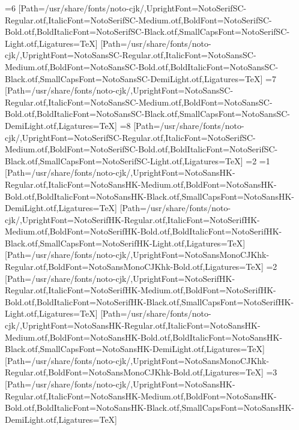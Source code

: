 \else\ifnum\value{CJKFonts}=6
[Path=/usr/share/fonts/noto-cjk/,UprightFont=NotoSerifSC-Regular.otf,ItalicFont=NotoSerifSC-Medium.otf,BoldFont=NotoSerifSC-Bold.otf,BoldItalicFont=NotoSerifSC-Black.otf,SmallCapsFont=NotoSerifSC-Light.otf,Ligatures=TeX]
[Path=/usr/share/fonts/noto-cjk/,UprightFont=NotoSansSC-Regular.otf,ItalicFont=NotoSansSC-Medium.otf,BoldFont=NotoSansSC-Bold.otf,BoldItalicFont=NotoSansSC-Black.otf,SmallCapsFont=NotoSansSC-DemiLight.otf,Ligatures=TeX]
\else\ifnum\value{CJKFonts}=7
[Path=/usr/share/fonts/noto-cjk/,UprightFont=NotoSansSC-Regular.otf,ItalicFont=NotoSansSC-Medium.otf,BoldFont=NotoSansSC-Bold.otf,BoldItalicFont=NotoSansSC-Black.otf,SmallCapsFont=NotoSansSC-DemiLight.otf,Ligatures=TeX]
\else\ifnum\value{CJKFonts}=8
[Path=/usr/share/fonts/noto-cjk/,UprightFont=NotoSerifSC-Regular.otf,ItalicFont=NotoSerifSC-Medium.otf,BoldFont=NotoSerifSC-Bold.otf,BoldItalicFont=NotoSerifSC-Black.otf,SmallCapsFont=NotoSerifSC-Light.otf,Ligatures=TeX]
\fi\fi\fi\fi\fi\fi\fi\fi\else
\ifnum\value{CJKLanguage}=2
\ifnum\value{CJKFonts}=1
[Path=/usr/share/fonts/noto-cjk/,UprightFont=NotoSansHK-Regular.otf,ItalicFont=NotoSansHK-Medium.otf,BoldFont=NotoSansHK-Bold.otf,BoldItalicFont=NotoSansHK-Black.otf,SmallCapsFont=NotoSansHK-DemiLight.otf,Ligatures=TeX]
[Path=/usr/share/fonts/noto-cjk/,UprightFont=NotoSerifHK-Regular.otf,ItalicFont=NotoSerifHK-Medium.otf,BoldFont=NotoSerifHK-Bold.otf,BoldItalicFont=NotoSerifHK-Black.otf,SmallCapsFont=NotoSerifHK-Light.otf,Ligatures=TeX]
[Path=/usr/share/fonts/noto-cjk/,UprightFont=NotoSansMonoCJKhk-Regular.otf,BoldFont=NotoSansMonoCJKhk-Bold.otf,Ligatures=TeX]
\else\ifnum\value{CJKFonts}=2
[Path=/usr/share/fonts/noto-cjk/,UprightFont=NotoSerifHK-Regular.otf,ItalicFont=NotoSerifHK-Medium.otf,BoldFont=NotoSerifHK-Bold.otf,BoldItalicFont=NotoSerifHK-Black.otf,SmallCapsFont=NotoSerifHK-Light.otf,Ligatures=TeX]
[Path=/usr/share/fonts/noto-cjk/,UprightFont=NotoSansHK-Regular.otf,ItalicFont=NotoSansHK-Medium.otf,BoldFont=NotoSansHK-Bold.otf,BoldItalicFont=NotoSansHK-Black.otf,SmallCapsFont=NotoSansHK-DemiLight.otf,Ligatures=TeX]
[Path=/usr/share/fonts/noto-cjk/,UprightFont=NotoSansMonoCJKhk-Regular.otf,BoldFont=NotoSansMonoCJKhk-Bold.otf,Ligatures=TeX]
\else\ifnum\value{CJKFonts}=3
[Path=/usr/share/fonts/noto-cjk/,UprightFont=NotoSansHK-Regular.otf,ItalicFont=NotoSansHK-Medium.otf,BoldFont=NotoSansHK-Bold.otf,BoldItalicFont=NotoSansHK-Black.otf,SmallCapsFont=NotoSansHK-DemiLight.otf,Ligatures=TeX]
